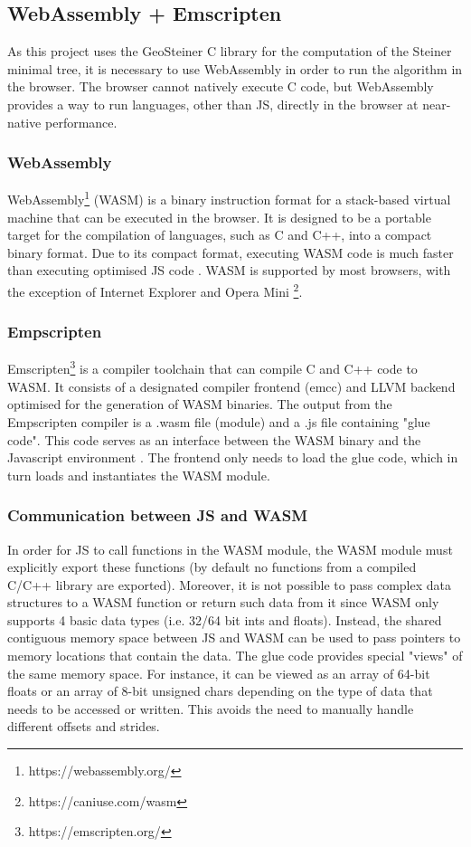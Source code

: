 \documentclass{l4proj}
\begin{document}
\subsection{WebAssembly + Emscripten}
As this project uses the GeoSteiner C library for the computation of the Steiner minimal tree, it is necessary to use WebAssembly in order to run the algorithm in the browser. The browser cannot natively execute C code, but WebAssembly provides a way to run languages, other than JS, directly in the browser at near-native performance.
\subsubsection{WebAssembly}
WebAssembly\footnote{https://webassembly.org/} (WASM) is a binary instruction format for a stack-based virtual machine that can be executed in the browser. It is designed to be a portable target for the compilation of languages, such as C and C++, into a compact binary format.
Due to its compact format, executing WASM code is much faster than executing optimised JS code \citep{WebAssemblyIntro}.
WASM is supported by most browsers, with the exception of Internet Explorer and Opera Mini \footnote{https://caniuse.com/wasm}.

\subsubsection{Empscripten}
\label{sec:emscripten}
Emscripten\footnote{https://emscripten.org/} is a compiler toolchain that can compile C and C++ code to WASM. It consists of a designated compiler frontend (emcc) and LLVM backend optimised for the generation of WASM binaries.
The output from the Empscripten compiler is a .wasm file (module) and a .js file containing "glue code". This code serves as an interface between the WASM binary and the Javascript environment \citep{Emscripten_tutorial}. The frontend only needs to load the glue code, which in turn loads and instantiates the WASM module.

\subsubsection{Communication between JS and WASM}
\label{sec:js_wasm_communication}
In order for JS to call functions in the WASM module, the WASM module must explicitly export these functions (by default no functions from a compiled C/C++ library are exported).
Moreover, it is not possible to pass complex data structures to a WASM function or return such data from it since WASM only supports 4 basic data types (i.e. 32/64 bit ints and floats).
Instead, the shared contiguous memory space between JS and WASM can be used to pass pointers to memory locations that contain the data.
The glue code provides special "views" of the same memory space. For instance, it can be viewed as an array of 64-bit floats or an array of 8-bit unsigned chars depending on the type of data that needs to be accessed or written.
This avoids the need to manually handle different offsets and strides.
\end{document}
